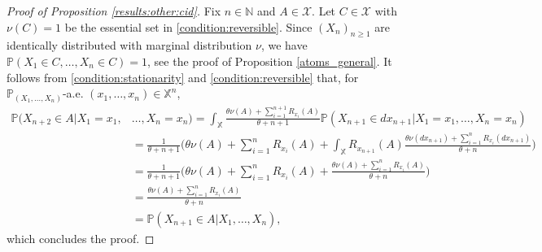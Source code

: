 \documentclass[10pt,a4paper]{amsart}
\begin{document}
\begin{proof}[Proof of Proposition \ref{results:other:cid}]
Fix $n\in\mathbb{N}$ and $A\in\mathcal{X}$. Let $C\in\mathcal{X}$ with $\nu(C)=1$ be the essential set in \eqref{condition:reversible}. Since $(X_n)_{n\geq1}$ are identically distributed with marginal distribution $\nu$, we have $\mathbb{P}(X_1\in C,\ldots,X_n\in C)=1$, see the proof of Proposition \ref{atoms_general}. It follows from \eqref{condition:stationarity} and \eqref{condition:reversible} that, for $\mathbb{P}_{(X_1,\ldots,X_n)}$-a.e. $(x_1,\ldots,x_n)\in\mathbb{X}^n$,
\begingroup\allowdisplaybreaks
\begin{align*}
\mathbb{P}(X_{n+2}\in A|X_1=x_1,&\ldots,X_n=x_n)=\int_\mathbb{X}\frac{\theta\nu(A)+\sum_{i=1}^{n+1}R_{x_i}(A)}{\theta+n+1}\mathbb{P}(X_{n+1}\in dx_{n+1}|X_1=x_1,\ldots,X_n=x_n)\\
&=\frac{1}{\theta+n+1}\bigg(\theta\nu(A)+\sum_{i=1}^nR_{x_i}(A)+\int_\mathbb{X}R_{x_{n+1}}(A)\frac{\theta\nu(dx_{n+1})+\sum_{i=1}^nR_{x_i}(dx_{n+1})}{\theta+n}\biggr)\\
&=\frac{1}{\theta+n+1}\bigg(\theta\nu(A)+\sum_{i=1}^nR_{x_i}(A)+\frac{\theta\nu(A)+\sum_{i=1}^nR_{x_i}(A)}{\theta+n}\biggr)\\
&=\frac{\theta\nu(A)+\sum_{i=1}^nR_{x_i}(A)}{\theta+n}\\
&=\mathbb{P}(X_{n+1}\in A|X_1,\ldots,X_n),
\end{align*}
\endgroup
which concludes the proof.
\end{proof}
\end{document}
